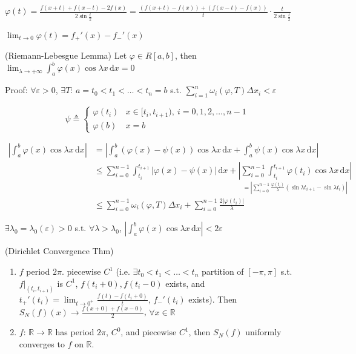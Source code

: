 
$\varphi(t)=\frac{f(x+t)+f(x-t)-2f(x)}{2\sin\frac{t}{2}}=\frac{\left(f(x+t)-f(x)\right)+\left(f(x-t)-f(x)\right)}{t}\cdot\frac{t}{2\sin\frac{t}{2}}$

$\lim_{t\to 0}\varphi(t)=f_+'(x)-f_-'(x)$

(Riemann-Lebesgue Lemma) Let $\varphi\in R[a,b]$, then $\lim_{\lambda\to+\infty}\int_a^b\varphi(x)\cos \lambda x\,\mathrm{d}x=0$

Proof: $\forall\varepsilon>0$, $\exists T:\,a=t_0<t_1<\dots<t_n=b$ s.t. $\sum_{i=1}^n\omega_i(\varphi,T)\Delta x_i<\varepsilon$

$$\psi\triangleq\begin{cases}
        \varphi(t_i) & x\in[t_i,t_{i+1}),\ i=0,1,2,\dots,n-1 \\
        \varphi(b)   & x=b
    \end{cases}$$

\begin{align*}
    \left|\int_a^b\varphi(x)\cos\lambda x\,\mathrm{d}x\right|
     & =\left|\int_a^b\left(\varphi(x)-\psi(x)\right)\cos\lambda x\,\mathrm{d}x+\int_a^b\psi(x)\cos\lambda x\,\mathrm{d}x\right|                                                                                                                                                                \\
     & \leq\sum_{i=0}^{n-1}\int_{t_i}^{t_{i+1}}\left|\varphi(x)-\psi(x)\right|\,\mathrm{d}x+\underset{=\left|\sum_{i=0}^{n-1}\frac{\varphi(t_i)}{\lambda}(\sin\lambda t_{i+1}-\sin\lambda t_i)\right|}{\left|\sum_{i=0}^{n-1}\int_{t_i}^{t_{i+1}}\varphi(t_i)\cos\lambda x\,\mathrm{d}x\right|} \\
     & \leq\sum_{i=0}^{n-1}\omega_i(\varphi,T)\Delta x_i+\sum_{i=0}^{n-1}\frac{2\left|\varphi(t_i)\right|}{\lambda}
\end{align*}

$\exists\lambda_0=\lambda_0(\varepsilon)>0$ s.t. $\forall\lambda>\lambda_0$, $\left|\int_a^b\varphi(x)\cos\lambda x\,\mathrm{d}x\right|<2\varepsilon$

(Dirichlet Convergence Thm)

\begin{enumerate}[label=(\Roman*)]
    \item $f$ period $2\pi$. piecewise $C^1$ (i.e. $\exists t_0<t_1<\dots<t_n$ partition of $[-\pi,\pi]$ s.t. $f|_{(t_i,t_{i+1})}$ is $C^1$, $f(t_i+0),f(t_i-0)$ exists, and $t_+'(t_i)=\lim_{t\to 0^+}\frac{f(t)-f(t_i+0)}{t}$, $f_-'(t_i)$ exists). Then $S_N(f)(x)\to\frac{f(x+0)+f(x-0)}{2}$, $\forall x\in\mathbb{R}$
    \item $f:\,\mathbb{R}\to\mathbb{R}$ has period $2\pi$, $C^0$, and piecewise $C^1$, then $S_N(f)$ uniformly converges to $f$ on $\mathbb{R}$.
\end{enumerate}

